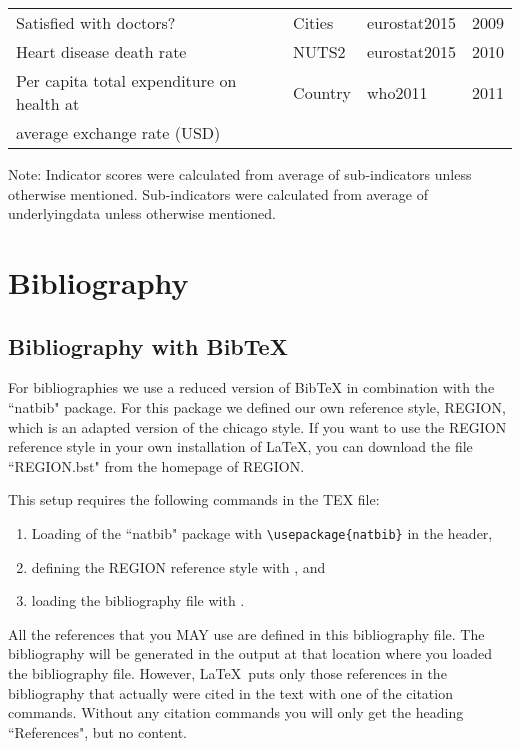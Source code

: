 \documentclass[a4paper,twoside]{article}
\begin{document}
{\begin{longtable}{llll}
    Satisfied with doctors? & Cities & eurostat2015 & 2009 \\
    Heart disease death rate & NUTS2 & eurostat2015 & 2010 \\
    Per capita total expenditure on health at & Country & who2011 & 2011 \\
    average exchange rate (USD) &  &  &  \\[3mm]
\end{longtable}
\noindent Note: Indicator scores were calculated from average of sub-indicators unless otherwise mentioned. Sub-indicators were calculated from average of underlyingdata unless otherwise mentioned.
}

\section{Bibliography}
\label{sec:5}

\subsection{Bibliography with BibTeX}
\label{sec:5.1}

For bibliographies we use a reduced version of BibTeX in combination with the ``natbib" package. For this package we defined our own reference style, REGION, which is an adapted version of the chicago style. If you want to use the REGION reference style in your own installation of \LaTeX, you can download the file ``REGION.bst" from the homepage of REGION.

This setup requires the following commands in the TEX file:
\begin{enumerate}
  \item Loading of the ``natbib" package with \verb|\usepackage{natbib}| in the header,
  \item defining the REGION reference style with \verb||, and
  \item loading the bibliography file with \verb||.
\end{enumerate}

All the references that you MAY use are defined in this bibliography file. The bibliography will be generated in the output at that location where you loaded the bibliography file. However, \LaTeX\ puts only those references in the bibliography that actually were cited in the text with one of the citation commands. Without any citation commands you will only get the heading ``References", but no content.
\end{document}
